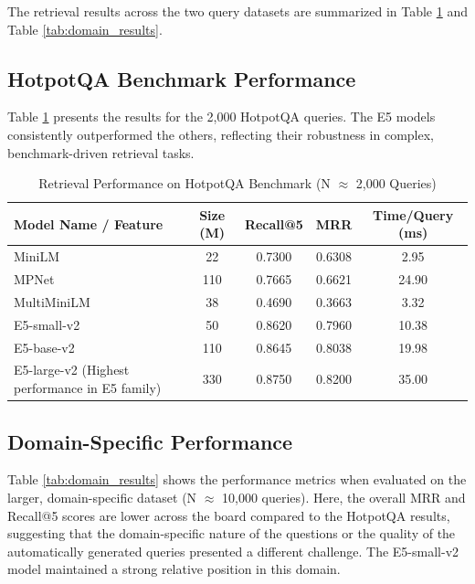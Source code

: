 \documentclass[11pt, a4paper]{article}
\begin{document}
The retrieval results across the two query datasets are summarized in Table \ref{tab:hotpot_results} and Table \ref{tab:domain_results}.

\subsection{HotpotQA Benchmark Performance}
Table \ref{tab:hotpot_results} presents the results for the 2,000 HotpotQA queries. The E5 models consistently outperformed the others, reflecting their robustness in complex, benchmark-driven retrieval tasks.

\begin{table}[htbp]
    \centering
    \caption{Retrieval Performance on HotpotQA Benchmark (N $\approx$ 2,000 Queries)}
    \label{tab:hotpot_results}
    \begin{tabular}{p{4.5cm}cccc} %
        \toprule %
        \textbf{Model Name / Feature} & \textbf{Size (M)} & \textbf{Recall@5} & \textbf{MRR} & \textbf{Time/Query (ms)} \\
        \midrule %
        MiniLM & 22 & 0.7300 & 0.6308 & 2.95 \\
        MPNet & 110 & 0.7665 & 0.6621 & 24.90 \\
        MultiMiniLM & 38 & 0.4690 & 0.3663 & 3.32 \\
        E5-small-v2 & 50 & 0.8620 & 0.7960 & 10.38 \\
        E5-base-v2 & 110 & 0.8645 & 0.8038 & 19.98 \\
        E5-large-v2 (Highest performance in E5 family) & 330 & 0.8750 & 0.8200 & 35.00 \\
        \bottomrule %
    \end{tabular}
\end{table}

\subsection{Domain-Specific Performance}
Table \ref{tab:domain_results} shows the performance metrics when evaluated on the larger, domain-specific dataset (N $\approx$ 10,000 queries). Here, the overall MRR and Recall@5 scores are lower across the board compared to the HotpotQA results, suggesting that the domain-specific nature of the questions or the quality of the automatically generated queries presented a different challenge. The E5-small-v2 model maintained a strong relative position in this domain.
\end{document}
